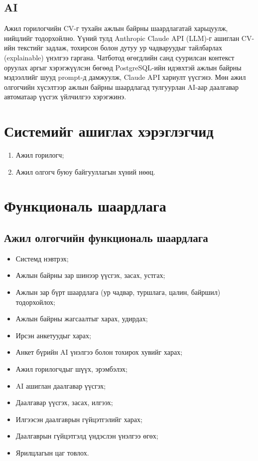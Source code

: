 \subsection*{AI} 
\par{}Ажил горилогчийн CV-г тухайн ажлын байрны шаардлагатай харьцуулж, нийцлийг тодорхойлно. Үүний тулд Anthropic Claude API (LLM)-г ашиглан CV-ийн текстийг задлаж, тохирсон болон дутуу ур чадваруудыг тайлбарлах (explainable) үнэлгээ гаргана. Чатботод өгөгдлийн санд суурилсан контекст оруулах аргыг хэрэгжүүлсэн бөгөөд PostgreSQL-ийн идэвхтэй ажлын байрны мэдээллийг шууд prompt-д дамжуулж, Claude API хариулт үүсгэнэ. Мөн ажил олгогчийн хүсэлтээр ажлын байрны шаардлагад тулгуурлан AI-аар даалгавар автоматаар үүсгэх үйлчилгээ хэрэгжинэ.

\section{Системийг ашиглах хэрэглэгчид}
\begin{enumerate}
    \item  Ажил горилогч;
    \item  Ажил олгогч буюу байгууллагын хүний нөөц.
\end{enumerate}
\section{Функциональ шаардлага}
\subsection*{Ажил олгогчийн функциональ шаардлага}
\begin{itemize}
\item Системд нэвтрэх;
\item Ажлын байрны зар шинээр үүсгэх, засах, устгах;
\item Ажлын зар бүрт шаардлага (ур чадвар, туршлага, цалин, байршил) тодорхойлох;
\item Ажлын байрны жагсаалтыг харах, удирдах;
\item Ирсэн анкетуудыг харах;
\item Анкет бүрийн AI үнэлгээ болон тохирох хувийг харах;
\item Ажил горилогчдыг шүүх, эрэмбэлэх;
\item AI ашиглан даалгавар үүсгэх;
\item Даалгавар үүсгэх, засах, илгээх;
\item Илгээсэн даалгаврын гүйцэтгэлийг харах;
\item Даалгаврын гүйцэтгэлд үндэслэн үнэлгээ өгөх;
\item Ярилцлагын цаг товлох.
\end{itemize}

